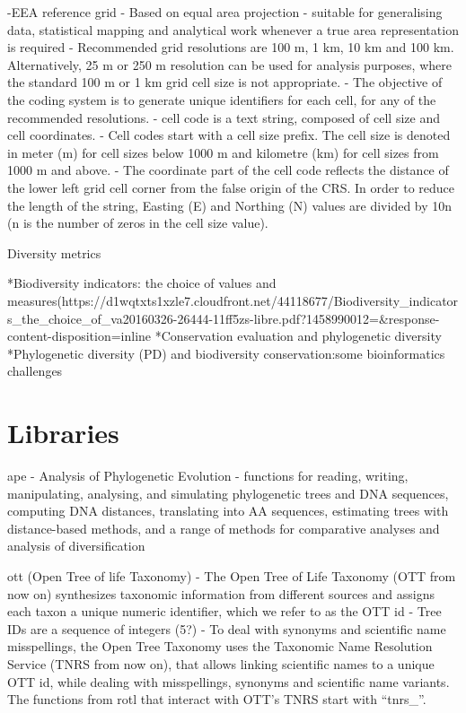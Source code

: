 -EEA reference grid
    - Based on equal area projection
    - suitable for generalising data, statistical mapping and analytical work whenever a true area representation is required
    - Recommended grid resolutions are 100 m, 1 km, 10 km and 100 km. Alternatively, 25 m or 250 m resolution can be used for
      analysis purposes, where the standard 100 m or 1 km grid cell size is not appropriate.
    - The objective of the coding system is to generate unique identifiers for each cell, for any of the
      recommended resolutions.
        - cell code is a text string, composed of cell size and cell coordinates. 
            - Cell codes start with a cell size prefix. The cell size is denoted in meter (m) for cell sizes below 1000 m and
              kilometre (km) for cell sizes from 1000 m and above.
            - The coordinate part of the cell code reflects the distance of the lower left grid cell corner from the false
              origin of the CRS. In order to reduce the length of the string, Easting (E) and Northing (N) values are divided
              by 10n (n is the number of zeros in the cell size value).

Diversity metrics

*Biodiversity indicators: the choice of values and measures(https://d1wqtxts1xzle7.cloudfront.net/44118677/Biodiversity_indicators_the_choice_of_va20160326-26444-11ff5zs-libre.pdf?1458990012=&response-content-disposition=inline%
*Conservation evaluation and phylogenetic diversity
*Phylogenetic diversity (PD) and biodiversity conservation:some bioinformatics challenges
\section{Libraries}

ape 
- Analysis of Phylogenetic Evolution
- functions for reading, writing, manipulating, analysing, and simulating phylogenetic
trees and DNA sequences, computing DNA distances, translating into AA sequences, estimating
trees with distance-based methods, and a range of methods for comparative analyses and analysis
of diversification

ott (Open Tree of life Taxonomy)
- The Open Tree of Life Taxonomy (OTT from now on) synthesizes taxonomic information from different sources and assigns each taxon a unique numeric identifier, which we refer to as the OTT id
    - Tree IDs are a sequence of integers (5?)
- To deal with synonyms and scientific name misspellings, the Open Tree Taxonomy uses the Taxonomic Name Resolution Service (TNRS from now on), that allows linking scientific names to a unique OTT id, while dealing with misspellings, synonyms and scientific name variants. The functions from rotl that interact with OTT’s TNRS start with “tnrs_”.

